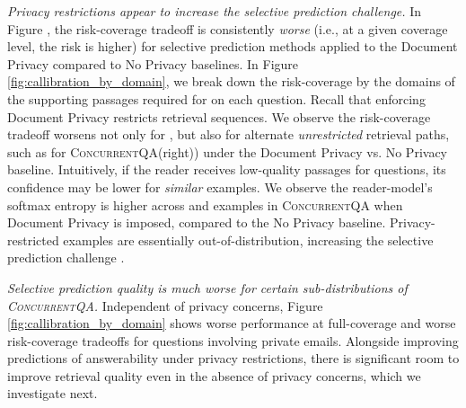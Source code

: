 \documentclass{article}
\renewcommand\cite{\citep}	\newcommand\shortcite{\citeyearpar}\newcommand\newcite{\citet}
\newcommand{\datasetname}{\textsc{ConcurrentQA}\xspace}
\begin{document}
\textit{Privacy restrictions appear to increase the selective prediction challenge.} In Figure , the risk-coverage tradeoff is consistently \textit{worse} (i.e., at a given coverage level, the risk is higher) for selective prediction methods applied to the Document Privacy compared to No Privacy baselines. In Figure \ref{fig:callibration_by_domain}, we break down the risk-coverage by the domains of the supporting passages required for  on each question. Recall that enforcing Document Privacy restricts  retrieval sequences. We observe the risk-coverage tradeoff worsens not only for , but also for alternate \textit{unrestricted} retrieval paths, such as  for \datasetname (right)) under the Document Privacy vs. No Privacy baseline. Intuitively, if the reader receives low-quality passages for  questions, its confidence may be lower for \textit{similar}  examples. We observe the reader-model's softmax entropy is  higher across  and  examples in \datasetname when Document Privacy is imposed, compared to the No Privacy baseline. Privacy-restricted examples are essentially out-of-distribution, increasing the selective prediction challenge \cite{kamath2020selectiveqa}.

\textit{Selective prediction quality is much worse for certain sub-distributions of \datasetname.} 
Independent of privacy concerns, Figure \ref{fig:callibration_by_domain} shows worse performance at full-coverage and worse risk-coverage tradeoffs for questions involving private emails. 
Alongside improving predictions of answerability under privacy restrictions, there is significant room to improve
retrieval quality even in the absence of privacy concerns, which we investigate next.
\end{document}
